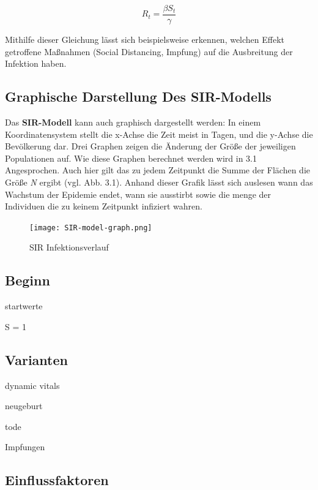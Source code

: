 \documentclass[12pt]{scrartcl} %
\begin{document}
$$ R_{t} = \frac{\beta S_{t}}{\gamma} $$

Mithilfe dieser Gleichung lässt sich beispielsweise erkennen, welchen Effekt getroffene Maßnahmen (Social Distancing, Impfung) auf die Ausbreitung der Infektion haben.


\subsection{Graphische Darstellung Des SIR-Modells}

Das \textbf{SIR-Modell} kann auch graphisch dargestellt werden:
In einem Koordinatensystem stellt die x-Achse die Zeit meist in Tagen, und die y-Achse die Bevölkerung dar. Drei Graphen zeigen die Änderung der Größe der jeweiligen Populationen auf. Wie diese Graphen berechnet werden wird in 3.1 Angesprochen.
Auch hier gilt das zu jedem Zeitpunkt die Summe der Flächen die Größe \textit{N} ergibt (vgl. Abb. 3.1).
Anhand dieser Grafik lässt sich auslesen wann das Wachstum der Epidemie endet, wann sie ausstirbt sowie die menge der Individuen die zu keinem Zeitpunkt infiziert wahren.

	\begin{figure}[h]
	\centering
	\texttt{[image: SIR-model-graph.png]} 
	\caption[quelle, titel]{SIR Infektionsverlauf}
	\end{figure}
	

\newpage
\subsection{Beginn}

startwerte

S = 1 


\subsection{Varianten}

dynamic vitals

\textnu neugeburt

\textmu tode

\textrho Impfungen


\newpage
\subsection{Einflussfaktoren}
\end{document}
